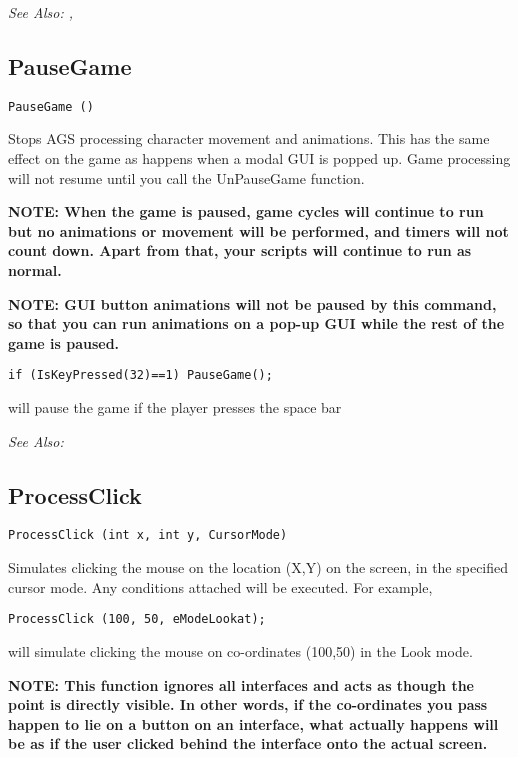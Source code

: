 \it{See Also:} ,



\subsection{PauseGame}\label{PauseGame}%

\begin{verbatim}
PauseGame ()
\end{verbatim}
Stops AGS processing character movement and animations. This has the same
effect on the game as happens when a modal GUI is popped up. Game processing
will not resume until you call the UnPauseGame function.

\bf{NOTE:} When the game is paused, game cycles will continue to run but
no animations or movement will be performed, and timers will not count down. Apart
from that, your scripts will continue to run as normal.

\bf{NOTE:} GUI button animations will not be paused by this command, so that
you can run animations on a pop-up GUI while the rest of the game is paused.

\begin{verbatim}
if (IsKeyPressed(32)==1) PauseGame();
\end{verbatim}
will pause the game if the player presses the space bar

\it{See Also:} 


\subsection{ProcessClick}\label{ProcessClick}%

\begin{verbatim}
ProcessClick (int x, int y, CursorMode)
\end{verbatim}
Simulates clicking the mouse on the location (X,Y) on the screen, in the
specified cursor mode. Any conditions attached will be executed. For example,
\begin{verbatim}
ProcessClick (100, 50, eModeLookat);
\end{verbatim}
will simulate clicking the mouse on co-ordinates (100,50) in the Look mode.

\bf{NOTE:} This function ignores all interfaces and acts as though the point is
directly visible. In other words, if the co-ordinates you pass happen to
lie on a button on an interface, what actually happens will be as if the
user clicked behind the interface onto the actual screen.


